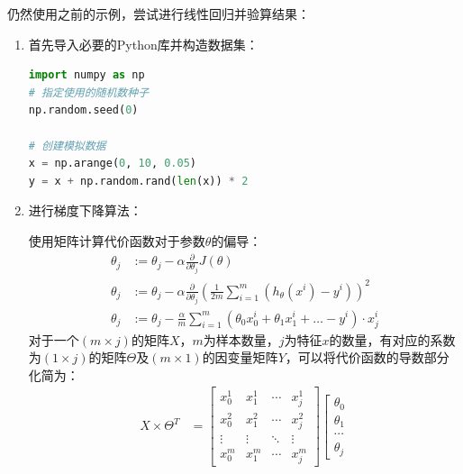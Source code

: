 \documentclass[12pt, a4paper]{article}
\begin{document}
           仍然使用之前的示例，尝试进行线性回归并验算结果：

           \begin{enumerate}
               \item 首先导入必要的Python库并构造数据集：
               \begin{lstlisting}[language=Python]
import numpy as np
# 指定使用的随机数种子
np.random.seed(0)

# 创建模拟数据
x = np.arange(0, 10, 0.05)
y = x + np.random.rand(len(x)) * 2
               \end{lstlisting}
               \item 进行梯度下降算法：
               
               使用矩阵计算代价函数对于参数$\theta$的偏导：
               \begin{align*}
                   \theta_j&:=\theta_j-\alpha\frac{\partial}{\partial\theta_j}J(\theta)\\
                   \theta_j&:=\theta_j-\alpha\frac{\partial}{\partial\theta_j}(\frac{1}{2m}\sum_{i=1}^{m}(h_\theta(x^i)-y^i))^2\\
                   \theta_j&:=\theta_j-\frac{\alpha}{m}\sum_{i=1}^{m}(\theta_0x_0^i+\theta_1x_1^i+\dots-y^i)\cdot x_j^i
               \end{align*}
               对于一个$(m\times j)$的矩阵$X$，$m$为样本数量，$j$为特征$x$的数量，有对应的系数为$(1\times j)$的矩阵$\Theta$及$(m\times 1)$的因变量矩阵$Y$，可以将代价函数的导数部分化简为：
               \begin{align*}
                   X \times \Theta^T & = 
                   \left[
                       \begin{matrix}
                           x_0^1 & x_1^1 & \cdots & x_j^1 \\
                           x_0^2 & x_1^2 & \cdots & x_j^2 \\
                           \vdots & \vdots & \ddots & \vdots \\
                           x_0^m & x_1^m & \cdots & x_j^m
                       \end{matrix}
                   \right]
                   \left[
                       \begin{matrix}
                           \theta_0 \\
                           \theta_1 \\
                           \cdots \\
                           \theta_j  

\end{matrix}
\end{align*}
\end{enumerate}
\end{document}
